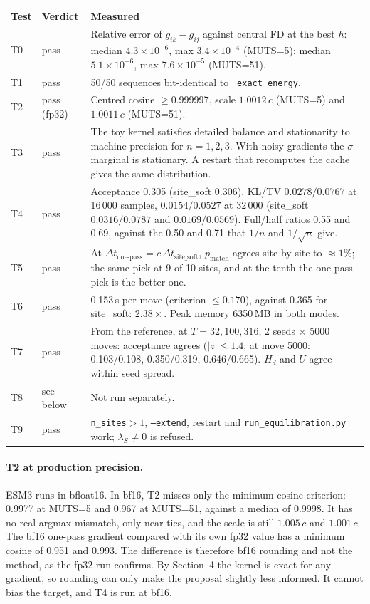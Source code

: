 \documentclass[11pt,a4paper]{article}
\newcommand{\dt}{\Delta t}
\begin{document}
\begin{center}
\begin{tabular}{@{}l l p{9.6cm}@{}}
\toprule
Test & Verdict & Measured \\
\midrule
T0 & pass & Relative error of $g_{ik}-g_{ij}$ against central FD at the best
  $h$: median $4.3\times10^{-6}$, max $3.4\times10^{-4}$ (MUTS=5); median
  $5.1\times10^{-6}$, max $7.6\times10^{-5}$ (MUTS=51). \\
T1 & pass & 50/50 sequences bit-identical to \texttt{\_exact\_energy}. \\
T2 & pass (fp32) & Centred cosine $\ge0.999997$, scale $1.0012\,c$ (MUTS=5) and
  $1.0011\,c$ (MUTS=51). \\
T3 & pass & The toy kernel satisfies detailed balance and stationarity to
  machine precision for $n=1,2,3$. With noisy gradients the $\sigma$-marginal
  is stationary. A restart that recomputes the cache gives the same
  distribution. \\
T4 & pass & Acceptance 0.305 (site\_soft 0.306). KL/TV $0.0278/0.0767$ at
  16\,000 samples, $0.0154/0.0527$ at 32\,000 (site\_soft $0.0316/0.0787$ and
  $0.0169/0.0569$). Full/half ratios 0.55 and 0.69, against the 0.50 and 0.71
  that $1/n$ and $1/\sqrt n$ give. \\
T5 & pass & At $\dt_{\text{one-pass}}=c\,\dt_{\text{site\_soft}}$, $p_{\mathrm{match}}$
  agrees site by site to $\approx1\%$; the same pick at 9 of 10 sites, and at the
  tenth the one-pass pick is the better one. \\
T6 & pass & 0.153\,s per move (criterion $\le0.170$), against 0.365 for
  site\_soft: $2.38\times$. Peak memory 6350\,MB in both modes. \\
T7 & pass & From the reference, at $T=32,100,316$, 2 seeds $\times$ 5000 moves:
  acceptance agrees ($|z|\le1.4$; at move 5000: 0.103/0.108, 0.350/0.319,
  0.646/0.665). $H_d$ and $U$ agree within seed spread. \\
T8 & see below & Not run separately. \\
T9 & pass & \texttt{n\_sites}$>1$, \texttt{--extend}, restart and
  \texttt{run\_equilibration.py} work; $\lambda_S\ne0$ is refused. \\
\bottomrule
\end{tabular}
\end{center}

\paragraph{T2 at production precision.} ESM3 runs in bfloat16. In bf16, T2
misses only the minimum-cosine criterion: 0.9977 at MUTS=5 and 0.967 at MUTS=51,
against a median of 0.9998. It has no real argmax mismatch, only near-ties, and
the scale is still $1.005\,c$ and $1.001\,c$. The bf16 one-pass gradient compared
with its own fp32 value has a minimum cosine of 0.951 and 0.993. The difference
is therefore bf16 rounding and not the method, as the fp32 run confirms. By
Section~4 the kernel is exact for any gradient, so rounding can only make the
proposal slightly less informed. It cannot bias the target, and T4 is run at
bf16.
\end{document}
